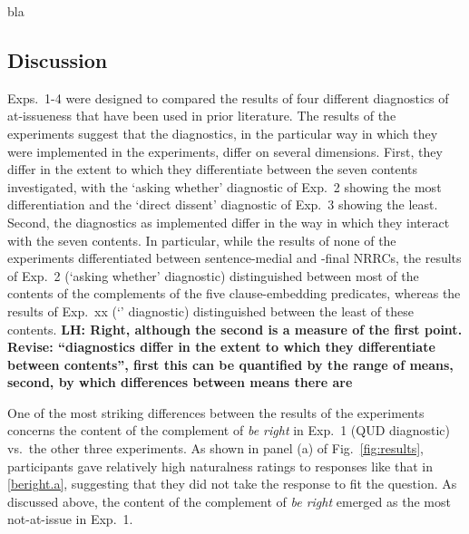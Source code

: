 \documentclass[times,linguex,xcolor]{glossa}
\newcommand{\lh}[1]{\textbf{\color{Cerulean}LH: #1}}
\begin{document}
  \newpage

  bla

  \newpage

  \subsection{Discussion}

  Exps.~1-4 were designed to compared the results of four different diagnostics of at-issueness that have been used in prior literature. The results of the experiments suggest that the diagnostics, in the particular way in which they were implemented in the experiments, differ on several dimensions. First, they differ in the extent to which they differentiate between the seven contents investigated, with the `asking whether' diagnostic of Exp.~2 showing the most differentiation and the `direct dissent' diagnostic of Exp.~3 showing the least. Second, the diagnostics as implemented differ in the way in which they interact with the seven contents. In particular, while the results of none of the experiments differentiated between sentence-medial and -final NRRCs, the results of Exp.~2 (`asking whether' diagnostic) distinguished between most of the contents of the complements of the five clause-embedding predicates, whereas the results of Exp.~xx (`' diagnostic) distinguished between the least of these contents.
  \lh{Right, although the second is a measure of the first point. Revise: \enquote{diagnostics differ in the extent to which they differentiate between contents}, first this can be quantified by the range of means, second, by which differences between means there are}

  One of the most striking differences between the results of the experiments concerns the content of the complement of \emph{be right} in Exp.~1 (QUD diagnostic) vs.\ the other three experiments. As shown in panel (a) of Fig.~\ref{fig:results}, participants gave relatively high naturalness ratings to responses like that in \ref{beright.a}, suggesting that they did not take the response to fit the question. As discussed above, the content of the complement of \emph{be right} emerged as the most not-at-issue in Exp.~1. 
\end{document}
